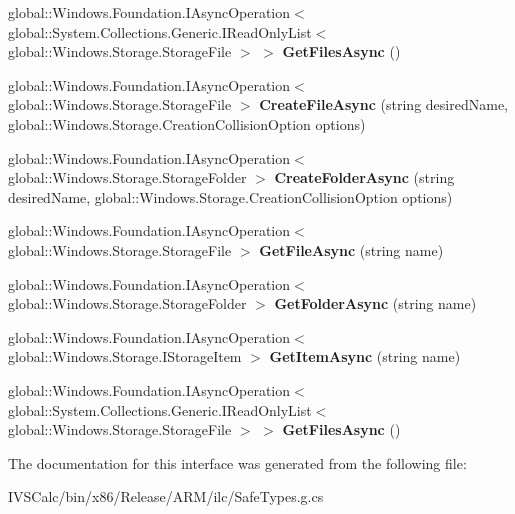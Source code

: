 \begin{DoxyCompactItemize}
global\+::\+Windows.\+Foundation.\+I\+Async\+Operation$<$ global\+::\+System.\+Collections.\+Generic.\+I\+Read\+Only\+List$<$ global\+::\+Windows.\+Storage.\+Storage\+File $>$ $>$ {\bfseries Get\+Files\+Async} ()
\item 
\mbox{\label{interface_windows_1_1_storage_1_1_i_storage_folder_adc3079d2557ccbaaea7a22907fe80ecb}} 
global\+::\+Windows.\+Foundation.\+I\+Async\+Operation$<$ global\+::\+Windows.\+Storage.\+Storage\+File $>$ {\bfseries Create\+File\+Async} (string desired\+Name, global\+::\+Windows.\+Storage.\+Creation\+Collision\+Option options)
\item 
\mbox{\label{interface_windows_1_1_storage_1_1_i_storage_folder_a2ffb245788da50cb1ed88be933be8520}} 
global\+::\+Windows.\+Foundation.\+I\+Async\+Operation$<$ global\+::\+Windows.\+Storage.\+Storage\+Folder $>$ {\bfseries Create\+Folder\+Async} (string desired\+Name, global\+::\+Windows.\+Storage.\+Creation\+Collision\+Option options)
\item 
\mbox{\label{interface_windows_1_1_storage_1_1_i_storage_folder_aedfb6354005587caee5a943d26e729e4}} 
global\+::\+Windows.\+Foundation.\+I\+Async\+Operation$<$ global\+::\+Windows.\+Storage.\+Storage\+File $>$ {\bfseries Get\+File\+Async} (string name)
\item 
\mbox{\label{interface_windows_1_1_storage_1_1_i_storage_folder_aa0b93668a8387515b51b4e00405533bc}} 
global\+::\+Windows.\+Foundation.\+I\+Async\+Operation$<$ global\+::\+Windows.\+Storage.\+Storage\+Folder $>$ {\bfseries Get\+Folder\+Async} (string name)
\item 
\mbox{\label{interface_windows_1_1_storage_1_1_i_storage_folder_a86e9de4a9052a0961a15017f936a126c}} 
global\+::\+Windows.\+Foundation.\+I\+Async\+Operation$<$ global\+::\+Windows.\+Storage.\+I\+Storage\+Item $>$ {\bfseries Get\+Item\+Async} (string name)
\item 
\mbox{\label{interface_windows_1_1_storage_1_1_i_storage_folder_af8686cb4a5545cc0060d80dfc6c15002}} 
global\+::\+Windows.\+Foundation.\+I\+Async\+Operation$<$ global\+::\+System.\+Collections.\+Generic.\+I\+Read\+Only\+List$<$ global\+::\+Windows.\+Storage.\+Storage\+File $>$ $>$ {\bfseries Get\+Files\+Async} ()
\end{DoxyCompactItemize}


The documentation for this interface was generated from the following file\+:\begin{DoxyCompactItemize}
\item 
I\+V\+S\+Calc/bin/x86/\+Release/\+A\+R\+M/ilc/Safe\+Types.\+g.\+cs\end{DoxyCompactItemize}
